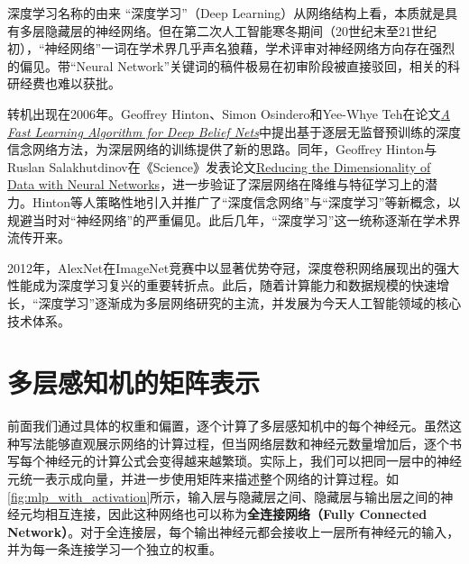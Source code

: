 \begin{cyanBox}{深度学习名称的由来}
“深度学习”（Deep Learning）从网络结构上看，本质就是具有多层隐藏层的神经网络。但在第二次人工智能寒冬期间（20世纪末至21世纪初），“神经网络”一词在学术界几乎声名狼藉，学术评审对神经网络方向存在强烈的偏见。带“Neural Network”关键词的稿件极易在初审阶段被直接驳回，相关的科研经费也难以获批。

转机出现在2006年。Geoffrey Hinton、Simon Osindero和Yee-Whye Teh在论文\href{https://doi.org/10.1162/neco.2006.18.7.1527}{\textit{A Fast Learning Algorithm for Deep Belief Nets}}中提出基于逐层无监督预训练的深度信念网络方法，为深层网络的训练提供了新的思路。同年，Geoffrey Hinton与Ruslan Salakhutdinov在《Science》发表论文\href{https://doi.org/10.1126/science.1127647}{Reducing the Dimensionality of Data with Neural Networks}，进一步验证了深层网络在降维与特征学习上的潜力。Hinton等人策略性地引入并推广了“深度信念网络”与“深度学习”等新概念，以规避当时对“神经网络”的严重偏见。此后几年，“深度学习”这一统称逐渐在学术界流传开来。

2012年，AlexNet在ImageNet竞赛中以显著优势夺冠，深度卷积网络展现出的强大性能成为深度学习复兴的重要转折点。此后，随着计算能力和数据规模的快速增长，“深度学习”逐渐成为多层网络研究的主流，并发展为今天人工智能领域的核心技术体系。
\end{cyanBox}

\section{多层感知机的矩阵表示}

前面我们通过具体的权重和偏置，逐个计算了多层感知机中的每个神经元。虽然这种写法能够直观展示网络的计算过程，但当网络层数和神经元数量增加后，逐个书写每个神经元的计算公式会变得越来越繁琐。实际上，我们可以把同一层中的神经元统一表示成向量，并进一步使用矩阵来描述整个网络的计算过程。如\cref{fig:mlp_with_activation}所示，输入层与隐藏层之间、隐藏层与输出层之间的神经元均相互连接，因此这种网络也可以称为\textbf{全连接网络（Fully Connected Network）}。对于全连接层，每个输出神经元都会接收上一层所有神经元的输入，并为每一条连接学习一个独立的权重。


